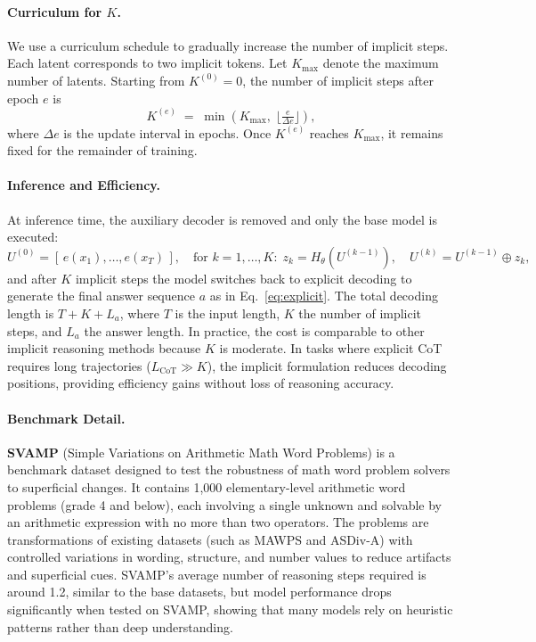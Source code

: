 \paragraph{Curriculum for \(K\).}  
We use a curriculum schedule to gradually increase the number of implicit steps. Each latent corresponds to two implicit tokens. Let \(K_{\max}\) denote the maximum number of latents. Starting from \(K^{(0)}=0\), the number of implicit steps after epoch \(e\) is
\[
K^{(e)} \;=\; \min\!\left(K_{\max},\;\Big\lfloor \tfrac{e}{\Delta e} \Big\rfloor \right),
\]
where \(\Delta e\) is the update interval in epochs. Once \(K^{(e)}\) reaches \(K_{\max}\), it remains fixed for the remainder of training.

\paragraph{Inference and Efficiency.}  
At inference time, the auxiliary decoder is removed and only the base model is executed:
\[
U^{(0)} = [\, e(x_1), \ldots, e(x_T) \,], \quad 
\text{for } k=1,\ldots,K:\;
z_k = H_\theta(U^{(k-1)}), \quad
U^{(k)} = U^{(k-1)} \oplus z_k ,
\]
and after $K$ implicit steps the model switches back to explicit decoding to generate the final answer sequence $a$ as in Eq.~\eqref{eq:explicit}.  
The total decoding length is $T + K + L_a$, where $T$ is the input length, $K$ the number of implicit steps, and $L_a$ the answer length. In practice, the cost is comparable to other implicit reasoning methods because $K$ is moderate. In tasks where explicit CoT requires long trajectories ($L_{\text{CoT}} \gg K$), the implicit formulation reduces decoding positions, providing efficiency gains without loss of reasoning accuracy.

\paragraph{Benchmark Detail.}
\label{app:benchmark_detail}
\textbf{SVAMP} \citep{patel-etal-2021-nlp} (Simple Variations on Arithmetic Math Word Problems) is a benchmark dataset designed to test the robustness of math word problem solvers to superficial changes. It contains 1,000 elementary-level arithmetic word problems (grade 4 and below), each involving a single unknown and solvable by an arithmetic expression with no more than two operators. The problems are transformations of existing datasets (such as MAWPS and ASDiv-A) with controlled variations in wording, structure, and number values to reduce artifacts and superficial cues. SVAMP’s average number of reasoning steps required is around 1.2, similar to the base datasets, but model performance drops significantly when tested on SVAMP, showing that many models rely on heuristic patterns rather than deep understanding. 

